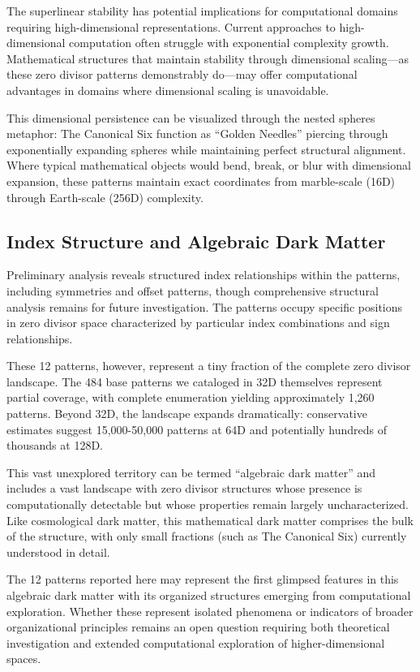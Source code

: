 \documentclass[11pt]{article}
\begin{document}
The superlinear stability has potential implications for computational domains requiring high-dimensional representations. Current approaches to high-dimensional computation often struggle with exponential complexity growth. Mathematical structures that maintain stability through dimensional scaling---as these zero divisor patterns demonstrably do---may offer computational advantages in domains where dimensional scaling is unavoidable.

This dimensional persistence can be visualized through the nested spheres metaphor: The Canonical Six function as ``Golden Needles'' piercing through exponentially expanding spheres while maintaining perfect structural alignment. Where typical mathematical objects would bend, break, or blur with dimensional expansion, these patterns maintain exact coordinates from marble-scale (16D) through Earth-scale (256D) complexity.

\subsection{Index Structure and Algebraic Dark Matter}

Preliminary analysis reveals structured index relationships within the patterns, including symmetries and offset patterns, though comprehensive structural analysis remains for future investigation. The patterns occupy specific positions in zero divisor space characterized by particular index combinations and sign relationships.

These 12 patterns, however, represent a tiny fraction of the complete zero divisor landscape. The 484 base patterns we cataloged in 32D themselves represent partial coverage, with complete enumeration yielding approximately 1,260 patterns. Beyond 32D, the landscape expands dramatically: conservative estimates suggest 15,000-50,000 patterns at 64D and potentially hundreds of thousands at 128D.

This vast unexplored territory can be termed ``algebraic dark matter'' and includes a vast landscape with zero divisor structures whose presence is computationally detectable but whose properties remain largely uncharacterized. Like cosmological dark matter, this mathematical dark matter comprises the bulk of the structure, with only small fractions (such as The Canonical Six) currently understood in detail.

The 12 patterns reported here may represent the first glimpsed features in this algebraic dark matter with its organized structures emerging from computational exploration. Whether these represent isolated phenomena or indicators of broader organizational principles remains an open question requiring both theoretical investigation and extended computational exploration of higher-dimensional spaces.
\end{document}
